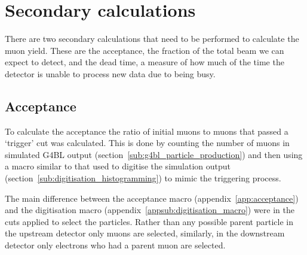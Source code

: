 \documentclass[]{article}
\begin{document}
\section{Secondary calculations} %
\label{sec:secondary_calculations}
There are two secondary calculations that need to be performed to calculate the muon yield. These are the acceptance, the fraction of the total beam we can expect to detect, and the dead time, a measure of how much of the time the detector is unable to process new data due to being busy.
\subsection{Acceptance} %
\label{sub:acceptance}
To calculate the acceptance the ratio of initial muons to muons that passed a `trigger' cut was calculated. This is done by counting the number of muons in simulated G4BL output (section~\ref{sub:g4bl_particle_production}) and then using a macro similar to that used to digitise the simulation output (section~\ref{sub:digitisation_histogramming}) to mimic the triggering process.

The main difference between the acceptance macro (appendix~\ref{app:acceptance}) and the digitisation macro (appendix~\ref{appsub:digitisation_macro}) were in the cuts applied to select the particles. Rather than any possible parent particle in the upstream detector only muons are selected, similarly, in the downstream detector only electrons who had a parent muon are selected.
\end{document}
